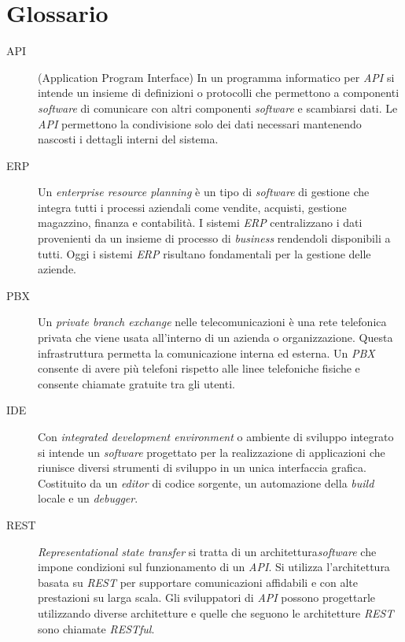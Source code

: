 \cleardoublepage
\appendix
{} %
\setcounter{page}{1}  %
{}
\chapter*{Glossario}


\begin{description}
  \item[\hypertarget{gls:API}{API}] (Application Program Interface) In un programma informatico per \textit{API} si intende un insieme di definizioni o protocolli che permettono a componenti \textit{software} di comunicare con altri componenti \textit{software} e scambiarsi dati. Le \textit{API} permettono la condivisione solo dei dati necessari mantenendo nascosti i dettagli interni del sistema. 

  \item[\hypertarget{gls:ERP}{ERP}] Un \textit{enterprise resource planning} è un tipo di \textit{software} di gestione che integra tutti i processi aziendali come vendite, acquisti, gestione magazzino, finanza e contabilità. I sistemi \textit{ERP} centralizzano i dati provenienti da un insieme di processo di \textit{business} rendendoli disponibili a tutti. Oggi i sistemi \textit{ERP} risultano fondamentali per la gestione delle aziende.
  
  \item[\hypertarget{gls:PBX}{PBX}] Un \textit{private branch exchange} nelle telecomunicazioni è una rete telefonica privata che viene usata all'interno di un azienda o organizzazione. Questa infrastruttura permetta la comunicazione interna ed esterna. Un \textit{PBX} consente di avere più telefoni rispetto alle linee telefoniche fisiche e consente chiamate gratuite tra gli utenti. 
  
  \item[\hypertarget{gls:IDE}{IDE}] Con \textit{integrated development environment} o ambiente di sviluppo integrato si intende un \textit{software} progettato per la realizzazione di applicazioni che riunisce diversi strumenti di sviluppo in un unica interfaccia grafica. Costituito da un \textit{editor} di codice sorgente, un automazione della \textit{build} locale e un \textit{debugger}. 
  
  \item[\hypertarget{gls:REST}{REST}] \textit{Representational state transfer} si tratta di un architettura\textit{software} che impone condizioni sul funzionamento di un \textit{API}.  Si utilizza l'architettura basata su \textit{REST} per supportare comunicazioni affidabili e con alte prestazioni su larga scala. Gli sviluppatori di \textit{API} possono progettarle utilizzando diverse architetture e quelle che seguono le architetture \textit{REST} sono chiamate \textit{RESTful}.
  

\end{description}
